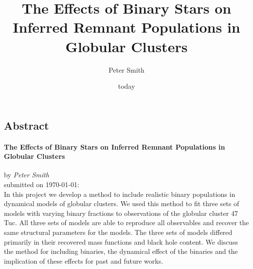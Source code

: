 \documentclass[12pt, oneside]{smuthesis}
\begin{document}
\frontmatter
\title{\sc The Effects of Binary Stars on Inferred Remnant Populations in Globular Clusters}
\author{Peter Smith}
\date{today}
\medskip

\maketitle
\pagestyle{headings}





\renewcommand{\ps}[1]{{\color{NavyBlue} Peter: #1}}


\begin{center}
    \section*{\center \sc Abstract}
    \paragraph*{\center \sc The Effects of Binary Stars on Inferred Remnant Populations in Globular Clusters\\}
    by {\em Peter Smith}\\
    submitted on \today:\\

    In this project we develop a method to include realistic binary populations in dynamical models
    of globular clusters. We used this method to fit three sets of models with varying binary
    fractions to observations of the globular cluster 47 Tuc. All three sets of models are able to
    reproduce all observables and recover the same structural parameters for the models. The three
    sets of models differed primarily in their recovered mass functions and black hole content. We
    discuss the method for including binaries, the dynamical effect of the binaries and the
    implication of these effects for past and future works.


\end{center}
\newpage

\tableofcontents
\listoffigures
\listoftables
\newpage
%
\end{document}
